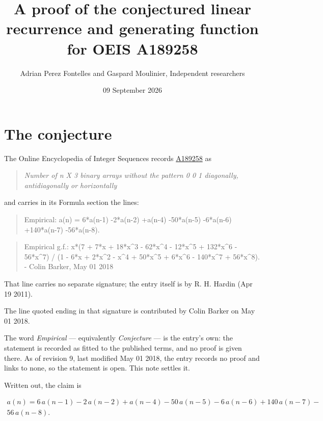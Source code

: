 \documentclass[11pt]{article}
\title{A proof of the conjectured linear recurrence and generating function for OEIS A189258}
\author{Adrian Perez Fontelles and Gaspard Moulinier, Independent researchers}
\date{09 September 2026}
\theoremstyle{definition}
\begin{document}
\maketitle
\section{The conjecture}

The Online Encyclopedia of Integer Sequences records \href{https://oeis.org/A189258}{A189258} as

\begin{quote}\itshape Number of n X 3 binary arrays without the pattern 0 0 1 diagonally, antidiagonally or horizontally\end{quote}

and carries in its Formula section the lines:

\begin{quote}\ttfamily Empirical: a(n) = 6*a(n-1) -2*a(n-2) +a(n-4) -50*a(n-5) -6*a(n-6) +140*a(n-7) -56*a(n-8).\end{quote}

\begin{quote}\ttfamily Empirical g.f.: x*(7 + 7*x + 18*x\textasciicircum{}3 - 62*x\textasciicircum{}4 - 12*x\textasciicircum{}5 + 132*x\textasciicircum{}6 - 56*x\textasciicircum{}7) / (1 - 6*x + 2*x\textasciicircum{}2 - x\textasciicircum{}4 + 50*x\textasciicircum{}5 + 6*x\textasciicircum{}6 - 140*x\textasciicircum{}7 + 56*x\textasciicircum{}8). - Colin Barker, May 01 2018\end{quote}

That line carries no separate signature; the entry itself is by R. H. Hardin (Apr 19 2011).

The line quoted ending in that signature is contributed by Colin Barker on May 01 2018.

The word {\itshape Empirical} --- equivalently {\itshape Conjecture} --- is the entry's own: the statement is recorded as fitted to the published terms, and no proof is given there. As of revision 9, last modified May 01 2018, the entry records no proof and links to none, so the statement is open. This note settles it.

Written out, the claim is

\begin{multline*} a(n) = 6\,a(n-1) - 2\,a(n-2) + a(n-4) - 50\,a(n-5) - 6\,a(n-6) + 140\,a(n-7) - \\ 56\,a(n-8). \end{multline*}
\end{document}
